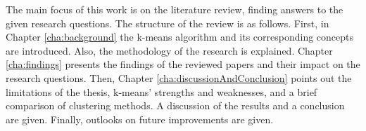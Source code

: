 The main focus of this work is on the literature review, finding answers to the given research questions.
The structure of the review is as follows.
First, in Chapter \ref{cha:background} the k-means algorithm and its corresponding concepts are introduced.
Also, the methodology of the research is explained.
Chapter \ref{cha:findings} presents the findings of the reviewed papers and their impact on the research questions.
Then, Chapter \ref{cha:discussionAndConclusion} points out the limitations of the thesis, k-means' strengths and weaknesses, and a brief comparison of clustering methods.
A discussion of the results and a conclusion are given.
Finally, outlooks on future improvements are given.